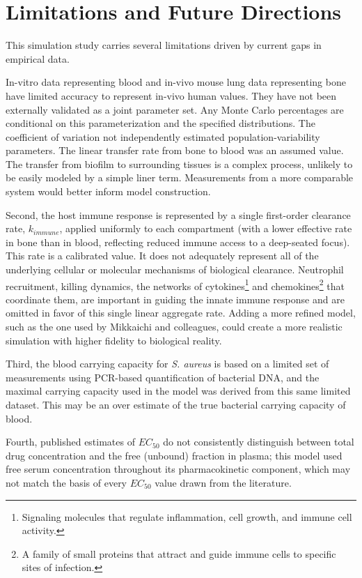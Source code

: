 \documentclass[utf8]{FrontiersinHarvard} %
\begin{document}
\section{Limitations and Future Directions}

This simulation study carries several limitations driven by current gaps
in empirical data.

In-vitro data representing blood and in-vivo mouse lung data representing bone have limited accuracy to represent in-vivo human values.  They have not been externally validated as a joint parameter set. Any Monte Carlo percentages are conditional on this parameterization and the specified distributions. The coefficient of variation not independently estimated population-variability parameters. The linear transfer rate from bone to blood was an assumed value.  The transfer from biofilm to surrounding tissues is a complex process, unlikely to be easily modeled by a simple liner term. Measurements from a more comparable system would better inform model construction.

Second, the host immune response is represented by a single first-order
clearance rate, $k_{immune}$, applied uniformly to each compartment (with
a lower effective rate in bone than in blood, reflecting reduced immune
access to a deep-seated focus). This rate is a calibrated value.  It does not adequately represent all of the underlying cellular or molecular mechanisms of biological clearance. Neutrophil recruitment, killing dynamics,
the networks of cytokines\footnote{Signaling molecules that regulate
inflammation, cell growth, and immune cell activity.} and
chemokines\footnote{A family of small proteins that attract and guide
immune cells to specific sites of infection.} that coordinate them, are
important in guiding the innate immune response and are omitted in favor of this single linear aggregate rate.  Adding a more refined model, such as the one used by Mikkaichi and colleagues, could create a more realistic simulation with higher fidelity to biological reality.

Third, the blood carrying capacity for \textit{S. aureus} is based on a
limited set of measurements using PCR-based quantification of bacterial
DNA, and the maximal carrying capacity used in the model was derived from
this same limited dataset.  This may be an over estimate of the true bacterial carrying capacity of blood.

Fourth, published estimates of $EC_{50}$ do not consistently distinguish
between total drug concentration and the free (unbound) fraction in
plasma; this model used free serum concentration throughout its
pharmacokinetic component, which may not match the basis of every $EC_{50}$
value drawn from the literature.
\end{document}
